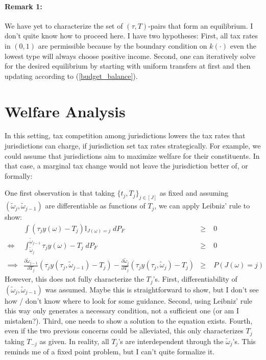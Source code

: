 \documentclass[fleqn,10pt]{olplainarticle}
\begin{document}
\paragraph{Remark 1:} We have yet to characterize the set of $(\tau, T)$-pairs that form an equilibrium. I don't quite know how to proceed here. I have two hypotheses: First, all tax rates in $(0,1)$ are permissible because by the boundary condition on $k(\cdot)$ even the lowest type will always choose positive income. Second, one can iteratively solve for the desired equilibrium by starting with uniform transfers at first and then updating according to (\ref{budget_balance}).\\

\section{Welfare Analysis}
In this setting, tax competition among jurisdictions lowers the tax rates that jurisdictions can charge, if jurisdiction set tax rates strategically. For example, we could assume that jurisdictions aim to maximize welfare for their constituents. In that case, a marginal tax change would not leave the jurisdiction better of, or formally:


\newpage
One first observation is that taking $\{t_j, T_j\}_{j\in [J]}$ as fixed and assuming $(\tilde\omega_j, \tilde\omega_{j-1})$ are differentiable as functions of $T_j$, we can apply Leibniz' rule to show:
\begin{align*}
    & \int \left(\tau_jy(\omega) - T_j\right) \mathbb{I}_{J(\omega) = j}  \;dP_F  & \geq & \;0 \\
    \iff & \int_{\tilde\omega_j}^{\tilde\omega_{j-1}} \tau_jy(\omega) - T_j  \;dP_F  &  \geq & \;  0 \\
    \implies & \frac{\partial\tilde\omega_{j-1}}{\partial T_j}\left(\tau_j y\left(\tau_j, \tilde\omega_{j-1}\right) - T_j\right) - \frac{\partial\tilde\omega_{j}}{\partial T_j} \left(\tau_j y\left(\tau_j, \tilde\omega_{j}\right) - T_j\right)&  \geq & \; P(J(\omega) = j)
\end{align*}
However, this does not fully characterize the $T_j$'s. First, differentiability of $(\tilde\omega_j, \tilde\omega_{j-1})$ was assumed. Maybe this is straightforward to show, but I don't see how / don't know where to look for some guidance. Second, using Leibniz' rule this way only generates a necessary condition, not a sufficient one (or am I mistaken?). Third, one needs to show a solution to the equation exists. Fourth, even if the two previous concerns could be alleviated, this only characterizes $T_j$ taking $T_{-j}$ as given. In reality, all $T_j$'s are interdependent through the $\tilde\omega_j$'s. This reminds me of a fixed point problem, but I can't quite formalize it.\\
\end{document}

